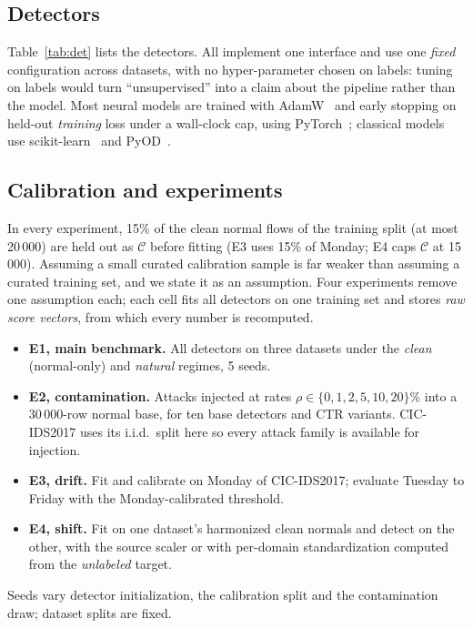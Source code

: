\documentclass[journal]{IEEEtran}
\begin{document}
\begin{table}[!t]
\caption{Datasets. ``Enc. feat.'' is the dimension after encoding and dropping constant columns; ``Atk. test/train'' is the percentage of attacks in the evaluation and in the released training split.}
\label{tab:data}
\centering\small

\end{table}

\subsection{Detectors}
Table~\ref{tab:det} lists the \nDetectors{} detectors. All implement one interface and use one \emph{fixed} configuration across datasets, with no hyper-parameter chosen on labels: tuning on labels would turn ``unsupervised'' into a claim about the pipeline rather than the model. Most neural models are trained with AdamW~\cite{loshchilov2019} and early stopping on held-out \emph{training} loss under a wall-clock cap, using PyTorch~\cite{paszke2019}; classical models use scikit-learn~\cite{pedregosa2011} and PyOD~\cite{zhao2019}.

\begin{table}[!t]
\caption{Detector zoo. Fit and scoring cost are means over the clean regime of E1 on a laptop CPU (relative, not a deployment benchmark).}
\label{tab:det}
\centering\small

\end{table}

\subsection{Calibration and experiments}
In every experiment, 15\% of the clean normal flows of the training split (at most 20\,000) are held out as $\mathcal{C}$ before fitting (E3 uses 15\% of Monday; E4 caps $\mathcal{C}$ at 15\,000). Assuming a small curated calibration sample is far weaker than assuming a curated training set, and we state it as an assumption. Four experiments remove one assumption each; each cell fits all detectors on one training set and stores \emph{raw score vectors}, from which every number is recomputed.
\begin{itemize}
\item \textbf{E1, main benchmark.} All detectors on three datasets under the \emph{clean} (normal-only) and \emph{natural} regimes, 5 seeds.
\item \textbf{E2, contamination.} Attacks injected at rates $\rho\in\{0,1,2,5,10,20\}\%$ into a 30\,000-row normal base, for ten base detectors and CTR variants. CIC-IDS2017 uses its i.i.d.\ split here so every attack family is available for injection.
\item \textbf{E3, drift.} Fit and calibrate on Monday of CIC-IDS2017; evaluate Tuesday to Friday with the Monday-calibrated threshold.
\item \textbf{E4, shift.} Fit on one dataset's harmonized clean normals and detect on the other, with the source scaler or with per-domain standardization computed from the \emph{unlabeled} target.
\end{itemize}
Seeds vary detector initialization, the calibration split and the contamination draw; dataset splits are fixed.
\end{document}
